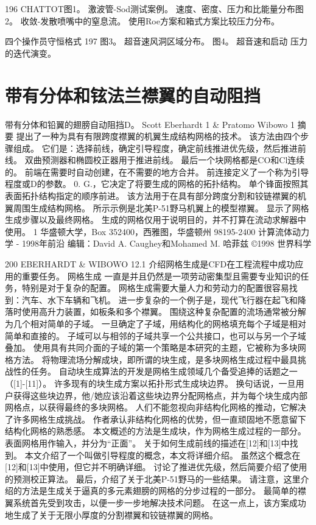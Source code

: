 \documentclass[UTF8,11pt,a4paper,openany,fontset=fandol]{ctexbook}
\begin{document}
196 CHATTOT图1。 激波管-Sod测试案例。 速度、密度、压力和比能量分布图2。 收敛-发散喷嘴中的窒息流。 使用Roe方案和箱式方案比较压力分布。

四个操作员守恒格式 197 图3。 超音速风洞区域分布。 图4。 超音速和启动 压力的迭代演变。

\clearpage
\chapter{带有分体和铉法兰襟翼的自动阻挡}
带有分体和铅翼的翅膀自动阻挡D。 Scott Eberhardt 1 \& Pratomo Wibowo 1 摘要 提出了一种为具有有限跨度襟翼的机翼生成结构网格的技术。 该方法由四个步骤组成。 它们是：选择前线，确定引导程度，确定前线推进优先级，然后推进前线。 双曲预测器和椭圆校正器用于推进前线。 最后一个块网格都是CO和Cl连续的。 前端在需要时自动创建，在不需要的地方合并。 前连接定义了一个称为引导程度或D的参数。 0. G.，它决定了将要生成的网格的拓扑结构。 单个锋面按照其表面拓扑结构指定的顺序前进。 该方法用于在具有部分跨度分割和铰链襟翼的机翼周围生成结构网格。 所示示例是北美P-51野马机翼上的模型襟翼。 显示了网格生成步骤以及最终网格。 生成的网格仅用于说明目的，并不打算在流动求解器中使用。 1 华盛顿大学，Box 352400，西雅图，华盛顿州 98195-2400 计算流体动力学 - 1998年前沿 编辑：David A. Caughey和Mohamed M. 哈菲兹 ©1998 世界科学

200 EBERHARDT \& WIBOWO 12.1 介绍网格生成是CFD在工程流程中成功应用的重要任务。 网格生成 一直是并且仍然是一项劳动密集型且需要专业知识的任务，特别是对于复杂的配置。 网格生成需要大量人力和劳动力的配置很容易找到：汽车、水下车辆和飞机。 进一步复杂的一个例子是，现代飞行器在起飞和降落时使用高升力装置，如板条和多个襟翼。 围绕这种复杂配置的流场通常被分解为几个相对简单的子域。 一旦确定了子域，用结构化的网格填充每个子域是相对简单和直接的。 子域可以与相邻的子域共享一个公共接口，也可以与另一个子域叠加。 使用具有共同介面的子域的第一个策略是本研究的主题，它被称为多块网格方法。 将物理流场分解成块，即所谓的块生成，是多块网格生成过程中最具挑战性的任务。 自动块生成算法的开发是网格生成领域几个备受追捧的话题之一（[1]-[11]）。 许多现有的块生成方案以拓扑形式生成块边界。 换句话说，一旦用户获得这些块边界，他/她应该沿着这些块边界分配网格点，并为每个块生成内部网格点，以获得最终的多块网格。 人们不能忽视向非结构化网格的推动，它解决了许多网格生成挑战。 作者承认非结构化网格的优势，但一直顽固地不愿意留下结构化网格的熟悉感。 本文概述的方法是生成块，作为网格生成过程的一部分。 表面网格用作输入，并分为“正面”。 关于如何生成前线的描述在[12]和[13]中找到。 本文介绍了一个叫做引导程度的概念，本文将详细介绍。 虽然这个概念在[12]和[13]中使用，但它并不明确详细。 讨论了推进优先级，然后简要介绍了使用的预测校正算法。 最后，介绍了关于北美P-51野马的一些结果。 请注意，这里介绍的方法是生成关于逼真的多元素翅膀的网格的分步过程的一部分。 最简单的襟翼系统首先受到攻击，以便一步一步地解决技术问题。 在这一点上，该方案成功地生成了关于无限小厚度的分割襟翼和铰链襟翼的网格。
\end{document}
